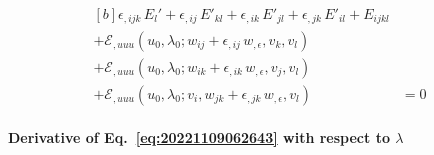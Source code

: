 \documentclass[12pt, final]{scrartcl}
\theoremstyle{definition}
\newcommand{\E}{\mathcal E}
\begin{document}
\begin{equation}
  \begin{aligned}[b]
    \epsilon_{,ijk} \, E_l' + \epsilon_{,ij} \, E'_{kl} + \epsilon_{,ik} \, E'_{jl} + \epsilon_{,jk} \, E'_{il} + E_{ijkl} &\\
    + \E_{,uuu}(u_0, \lambda_0; w_{ij} + \epsilon_{,ij} \, w_{,\epsilon},  v_k, v_l) &\\
    + \E_{,uuu}(u_0, \lambda_0; w_{ik} + \epsilon_{,ik} \,  w_{,\epsilon}, v_j, v_l) &\\
    + \E_{,uuu}(u_0, \lambda_0; v_i, w_{jk} + \epsilon_{,jk} \,  w_{,\epsilon}, v_l) &= 0
  \end{aligned}
\end{equation}

\paragraph{Derivative of Eq.~\eqref{eq:20221109062643} with respect to \(\lambda\)}
\end{document}
